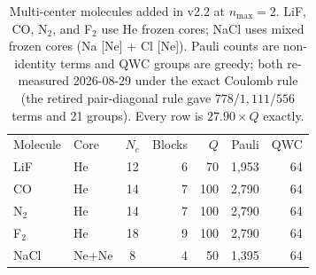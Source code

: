 \documentclass[twocolumn,pra,amsmath,amssymb,superscriptaddress]{revtex4-2}
\newcommand{\gvq}[2]{#2}
\begin{document}
\begin{table}[h]
\caption{Multi-center molecules added in v2.2 at $n_{\max}=2$.
  LiF, CO, N$_2$, and F$_2$ use He frozen cores; NaCl uses mixed
  frozen cores (Na [Ne] + Cl [Ne]).  Pauli counts are non-identity terms
  and QWC groups are greedy; both re-measured 2026-08-29 under the exact
  Coulomb rule (the retired pair-diagonal rule gave $778$/$1{,}111$/$556$
  terms and 21 groups).  Every row is $\gvq{composed_coeff}{27.90} \times Q$ exactly.}
\label{tab:multicenter}
\begin{ruledtabular}
\begin{tabular}{llcrrrr}
Molecule & Core & $N_e$ & Blocks & $Q$ & Pauli & QWC \\
\colrule
LiF      & He   & 12 & 6 &  70 & 1{,}953 & 64 \\
CO       & He   & 14 & 7 & 100 & 2{,}790 & 64 \\
N$_2$    & He   & 14 & 7 & 100 & 2{,}790 & 64 \\
F$_2$    & He   & 18 & 9 & 100 & 2{,}790 & 64 \\
NaCl     & Ne+Ne & 8 & 4 &  50 & 1{,}395 & 64 \\
\end{tabular}
\end{ruledtabular}
\end{table}
\end{document}
